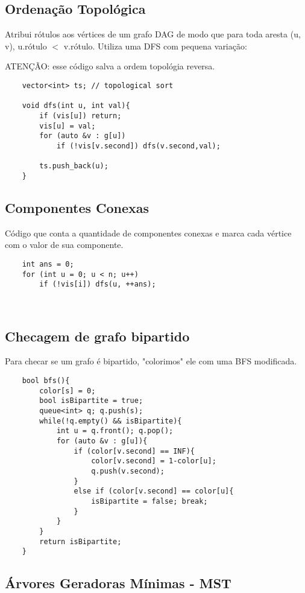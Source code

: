 \subsection{Ordenação Topológica} 
Atribui rótulos aos vértices de um grafo DAG de modo que para toda aresta (u, v), 
u.rótulo $<$ v.rótulo. Utiliza uma DFS com pequena variação:
\par ATENÇÃO: esse código salva a ordem topológia reversa.
\begin{verbatim}
    vector<int> ts; // topological sort
    
    void dfs(int u, int val){
        if (vis[u]) return;
        vis[u] = val;
        for (auto &v : g[u])
            if (!vis[v.second]) dfs(v.second,val);
        
        ts.push_back(u);   
    }
\end{verbatim}

\subsection{Componentes Conexas}
\par Código que conta a quantidade de componentes conexas e marca cada vértice com o valor de sua componente.
\begin{verbatim}
    int ans = 0;
    for (int u = 0; u < n; u++)
        if (!vis[i]) dfs(u, ++ans);
        
    
\end{verbatim}

\subsection{Checagem de grafo bipartido}
\par Para checar se um grafo é bipartido, "colorimos" ele com uma BFS modificada.
\begin{verbatim}
    bool bfs(){
        color[s] = 0;
        bool isBipartite = true;
        queue<int> q; q.push(s);
        while(!q.empty() && isBipartite){
            int u = q.front(); q.pop();
            for (auto &v : g[u]){
                if (color[v.second] == INF){
                    color[v.second] = 1-color[u];
                    q.push(v.second);
                }
                else if (color[v.second] == color[u]{
                    isBipartite = false; break;
                }
            }
        }
        return isBipartite;
    }
\end{verbatim}

\subsection{Árvores Geradoras Mínimas - MST}

